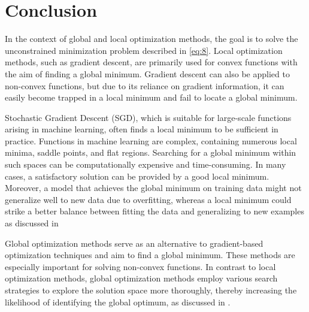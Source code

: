 \section{Conclusion}

In the context of global and local optimization methods, the goal is to solve the unconstrained minimization problem described in \ref{eq:8}. Local optimization methods, such as gradient descent, are primarily used for convex functions with the aim of finding a global minimum. Gradient descent can also be applied to non-convex functions, but due to its reliance on gradient information, it can easily become trapped in a local minimum and fail to locate a global minimum.

Stochastic Gradient Descent (SGD), which is suitable for large-scale functions arising in machine learning, often finds a local minimum to be sufficient in practice. Functions in machine learning are complex, containing numerous local minima, saddle points, and flat regions. Searching for a global minimum within such spaces can be computationally expensive and time-consuming. In many cases, a satisfactory solution can be provided by a good local minimum. Moreover, a model that achieves the global minimum on training data might not generalize well to new data due to overfitting, whereas a local minimum could strike a better balance between fitting the data and generalizing to new examples as discussed in \cite[282-290]{Goodfellow-et-al-2016}

Global optimization methods serve as an alternative to gradient-based optimization techniques and aim to find a global minimum. These methods are especially important for solving non-convex functions. In contrast to local optimization methods, global optimization methods employ various search strategies to explore the solution space more thoroughly, thereby increasing the likelihood of identifying the global optimum, as discussed in \cite[1-5]{horst1995handbook}. 
